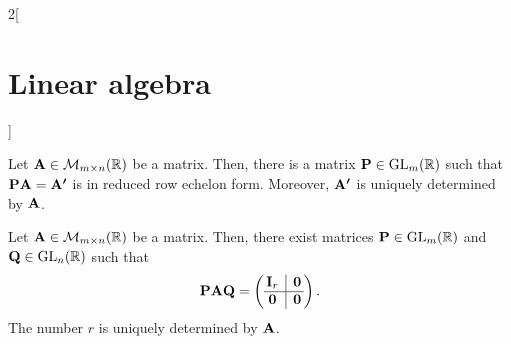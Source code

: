 \documentclass[../../../main.tex]{subfiles}
\begin{document}
\begin{multicols}{2}[\section{Linear algebra}]
\begin{theorem}
    Let $\boldsymbol{\mathrm{A}}\in\mathcal{M}_{m\times n}(\mathbb{R})$ be a matrix. Then, there is a matrix $\boldsymbol{\mathrm{P}}\in\mathrm{GL}_m(\mathbb{R})$ such that $\boldsymbol{\mathrm{P}}\boldsymbol{\mathrm{A}}=\boldsymbol{\mathrm{A'}}$ is in reduced row echelon form. Moreover, $\boldsymbol{\mathrm{A'}}$ is uniquely determined by $\boldsymbol{\mathrm{A}}$.
  \end{theorem}
  \begin{theorem}
    Let $\boldsymbol{\mathrm{A}}\in\mathcal{M}_{m\times n}(\mathbb{R})$ be a matrix. Then, there exist matrices $\boldsymbol{\mathrm{P}}\in\mathrm{GL}_m(\mathbb{R})$ and $\boldsymbol{\mathrm{Q}}\in\mathrm{GL}_n(\mathbb{R})$ such that
    $$\vectorfunction{P}\vectorfunction{A}\vectorfunction{Q}=\left(
      \begin{array}{@{\,} c|c @{\,}}
          \vectorfunction{I}_r & \vectorfunction{0} \\
          \hline
          \vectorfunction{0}   & \vectorfunction{0}
        \end{array}
      \right).$$
    The number $r$ is uniquely determined by $\boldsymbol{\mathrm{A}}$.
  \end{theorem}

\end{multicols}
\end{document}
